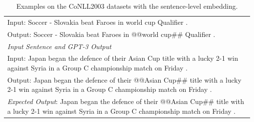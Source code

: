 \documentclass{article}
\begin{document}
\begin{table}[th!]
{\begin{tabular}{l}
Input: Soccer - Slovakia beat Faroes in world cup Qualifier . \\
Output: Soccer - Slovakia beat Faroes in @@world cup\#\# Qualifier . \\\midrule
\textit{Input Sentence and GPT-3 Output} \\
Input: Japan began the defence of their Asian Cup title with a lucky 2-1 win against Syria in a Group C championship match on Friday . \\
Output: Japan began the defence of their @@Asian Cup\#\# title with a lucky 2-1 win against Syria in a Group C championship match on Friday . \\
{\color{blue}\it Expected Output}: Japan began the defence of their @@Asian Cup\#\# title with a lucky 2-1 win against Syria in a Group C championship match on Friday . \\\bottomrule

    \end{tabular}
    }
     \caption{Examples on the CoNLL2003 datasets with the sentence-level embedding.}
    \label{tab:example_sentence_level_embedding}
\end{table}
\end{document}
